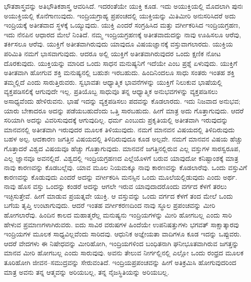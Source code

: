 ಭೌತಶಾಸ್ತ್ರವನ್ನು ಅತಿಭೌತಿಕಶಾಸ್ತ್ರ ಆವರಿಸಿದೆ. ಇದರಂತೆಯೇ ಯುಕ್ತಿ ಕೂಡ. ಇದು ಅಯುಕ್ತಿಯಲ್ಲಿ ಮೊದಲಾಗಿ ಪುನಃ ಅಯುಕ್ತಿಯಲ್ಲಿ ಕೊನೆಗಾಣುವುದು. ಇಂದ್ರಿಯಗ್ರಾಹ್ಯ ಪ್ರಪಂಚದಲ್ಲಿ ಯುಕ್ತಿಯನ್ನು ಮಿತಿಮೀರಿ ಅನುಸರಿಸಿದರೆ ಅದು ಇಂದ್ರಿಯಕ್ಕೆ ಅತೀತವಾದ ಸ್ಥಳಕ್ಕೆ ಒಯ್ಯುವುದು. ಯುಕ್ತಿ ಎಂದರೆ ಸಂಗ್ರಹಿಸಿದ ಮತ್ತು ವರ್ಗೀಕರಿಸಿದ ಇಂದ್ರಿಯಗ್ರಹಣ, ಇದು ನೆನಪಿನ ಆಧಾರದ ಮೇಲೆ ನಿಂತಿದೆ. ನಮ್ಮ ಇಂದ್ರಿಯಗ್ರಹಣಕ್ಕೆ ಅತೀತವಾದುದನ್ನು ನಾವು ಊಹಿಸಲೂ ಆರೆವು, ತರ್ಕಿಸಲೂ ಆರೆವು. ಯುಕ್ತಿಗೆ ಅತೀತವಾಗಿರುವುದು ಯಾವುದೂ ವಿಷಯಜ್ಞಾನಕ್ಕೆ ವಸ್ತುವಾಗಲಾರದು. ಯುಕ್ತಿಯ ಪರಿಮಿತಿ ನಮಗೆ ಭಾಸವಾಗುವುದು. ಆದರೂ ಅಲ್ಲಿ ಯುಕ್ತಿಗೆ ಅತೀತವಾಗಿರುವುದರ ಒಂದು ಕ್ಷಣಿಕ ನೋಟ ದೊರಕುವುದು. ಯುಕ್ತಿಯನ್ನು ಮಾರಿದ ಒಂದು ಸಾಧನ ಮನುಷ್ಯನಿಗೆ ಇದೆಯೇ ಎಂಬ ಪ್ರಶ್ನೆ ಏಳುವುದು. ಯುಕ್ತಿಗೆ ಅತೀತವಾಗಿ ಹೋಗುವ ಶಕ್ತಿ ಮನುಷ್ಯನಲ್ಲಿ ಬಹುಶಃ ಇರಬಹುದು. ಹಿಂದಿನಿಂದಲೂ ಸಾಧು ಸಂತರು ಇಂತಹ ಶಕ್ತಿ ತಮ್ಮಲ್ಲಿದೆ ಎಂದು ಸಾರುತ್ತಿರುವರು. ಸ್ವಭಾವತಃ ಆಧ್ಯಾತ್ಮಿಕ ಭಾವನೆಗಳನ್ನು ಯುಕ್ತಿಗೆ ನಿಲುಕುವ ಭಾಷೆಯಲ್ಲಿ ವ್ಯಕ್ತಪಡಿಸಲಿಕ್ಕೆ ಆಗುವುದೇ ಇಲ್ಲ. ಪ್ರತಿಯೊಬ್ಬ ಸಾಧುವೂ ತನ್ನ ಆಧ್ಯಾತ್ಮಿಕ ಅನುಭವಗಳನ್ನು ವ್ಯಕ್ತಪಡಿಸಲು ಅಸಾಧ್ಯವೆಂದು ಹೇಳಿರುವನು. ಭಾಷೆ ಇದನ್ನು ವ್ಯಕ್ತಪಡಿಸಲು ಪದವನ್ನು ಕೊಡಲಾರದು. ಇದು ನಿಜವಾದ ಅನುಭವ; ಯಾರು ಬೇಕಾದರೂ ಅದನ್ನು ಪಡೆಯಬಹುದೆಂದು ಒತ್ತಿ ಸಾರಬಹುದು. ಹೀಗೆ ಮಾತ್ರ ಅದು ಗೊತ್ತಾಗುವುದು. ಆದರೆ ಸರಿಯಾಗಿ ಅದನ್ನು ವಿವರಿಸುವುದಕ್ಕೆ ಆಗುವುದಿಲ್ಲ. ಧರ್ಮ ಎಂಬುದು ಪ್ರಕೃತಿಯಲ್ಲಿ ಅತೀತವಾಗಿ ಇರುವುದನ್ನು ಮಾನವನಲ್ಲಿ ಅತೀತವಾಗಿ ಇರುವುದರ ಮೂಲಕ ತಿಳಿಯುವುದು. ನಮಗೆ ಮಾನವನ ವಿಷಯದಲ್ಲಿ ತಿಳಿದಿರುವುದು ಬಹಳ ಅಲ್ಪ. ಆದಕಾರಣ ಜಗತ್ತಿನ ವಿಷಯದಲ್ಲಿ ತಿಳಿದಿರುವುದೂ ಕೂಡ ಅಲ್ಪವೇ. ನಮಗೆ ಮಾನವನ ವಿಷಯ ಹೆಚ್ಚು ಗೊತ್ತಾದರೆ ವಿಶ್ವದ ವಿಷಯವೂ ಹೆಚ್ಚು ಗೊತ್ತಾಗುವುದು. ಮಾನವನೆ ಜಗತ್ತಿನಲ್ಲಿರುವ ಎಲ್ಲ ವಸ್ತುಗಳ ಸಾರಸ್ವರೂಪ, ಎಲ್ಲ ಜ್ಞಾನವೂ ಅವನಲ್ಲಿದೆ. ವಿಶ್ವದಲ್ಲಿ ಇಂದ್ರಿಯಗ್ರಹಣದ ಎಲ್ಲೆಯೊಳಗೆ ಬರುವ ಯಾವುದೋ ಕನಿಷ್ಟಾಂಶಕ್ಕೆ ಮಾತ್ರ ನಾವು ಕಾರಣವನ್ನು ಕೊಡಬಲ್ಲೆವು. ಯಾವ ಮೂಲ ನಿಯಮಕ್ಕೂ ನಾವು ಕಾರಣವನ್ನು ಕೊಡಲಾರೆವು. ಒಂದು ವಸ್ತುವಿಗೆ ಕಾರಣವನ್ನು ಕೊಡುವುದು ಎಂದರೆ ಅದನ್ನು ವರ್ಗೀಕರಿಸಿ ಮನಸ್ಸಿನ ಒಂದು ಮೂಲೆಯಲ್ಲಿಡುವುದು ಎಂದು ಅರ್ಥ. ನಾವು ಹೊಸ ವಸ್ತು ಒಂದನ್ನು ಕಂಡರೆ ಅದನ್ನು ಆಗಲೇ ಇರುವ ಯಾವುದಾದರೊಂದು ವರ್ಗದ ಕೆಳಗೆ ತರಲು ಇಚ್ಛಿಸುತ್ತೇವೆ. ಹೀಗೆ ಮಾಡುವ ಪ್ರಯತ್ನವೇ ಯುಕ್ತಿ. ಆ ವಸ್ತುವನ್ನು ಒಂದು ವರ್ಗದ ಕೆಳಗೆ ತಂದ ಮೇಲೆ ಒಂದು ಬಗೆಯ ತೃಪ್ತಿ ಉಂಟಾಗುವುದು. ಆದರೆ ಇಂತಹ ವರ್ಗೀಕರಣದಿಂದ ನಾವು ಸ್ಥೂಲ ಪ್ರಪಂಚವನ್ನು ಮೀರಿ ಹೋಗಲಾರೆವು. ಹಿಂದಿನ ಕಾಲದ ಮಹಾತ್ಮರೆಲ್ಲ ಮನುಷ್ಯನು ಇಂದ್ರಿಯಗಳನ್ನು ಮೀರಿ ಹೋಗಬಲ್ಲ ಎಂದು ಸಾರಿ ಹೇಳುವ ಪ್ರಮಾಣಗಳಾಗಿರುವರು. ಐದು ಸಾವಿರ ವರುಷಗಳ ಹಿಂದೆಯೇ ಉಪನಿಷತ್ತುಗಳು ಭಗವತ್ ಸಾಕ್ಷಾತ್ಕಾರವು ಇಂದ್ರಿಯಗಳ ಮೂಲಕ ಸಾಧ್ಯವಿಲ್ಲವೆಂದು ಸಾರಿದವು. ಆಧುನಿಕ ಅಜ್ಞೇಯತಾ ವಾದಿಗಳೂ ಕೂಡ ಇದನ್ನು ಒಪ್ಪುವರು. ಆದರೆ ವೇದಗಳು ಈ ನಿಷೇಧವನ್ನು ಮೀರಿಹೋಗಿ, ಇಂದ್ರಿಯಗಳಿಂದ ಬಂಧಿತನಾಗಿ ಘನೀಭೂತವಾಗಿರುವ ಜಗತ್ತನ್ನು ಮಾನವ ಮೀರಿ ಹೋಗಬಲ್ಲ ಎಂದು ಸಾರುವುವು. ಅವನು ತೇಲುವ ನೀರ್ಗಲ್ಲಿನಲ್ಲಿ ಎಲ್ಲೋ ಒಂದು ರಂಧ್ರದ ಮೂಲಕ ತೂರಿಹೋಗಿ ಜೀವನ–ಸಮುದ್ರವನ್ನು ಸೇರುವಂತಿದೆ. ಇಂದ್ರಿಯಪ್ರಪಂಚವನ್ನು ಹೀಗೆ ಅತಿಕ್ರಮಿಸಿ ಹೋಗುವುದರಿಂದ ಮಾತ್ರ ಅವನು ತನ್ನ ಆತ್ಮವನ್ನು ಅರಿಯಬಲ್ಲ, ತನ್ನ ನೈಜಸ್ಥಿತಿಯನ್ನು ಅರಿಯಬಲ್ಲ.


